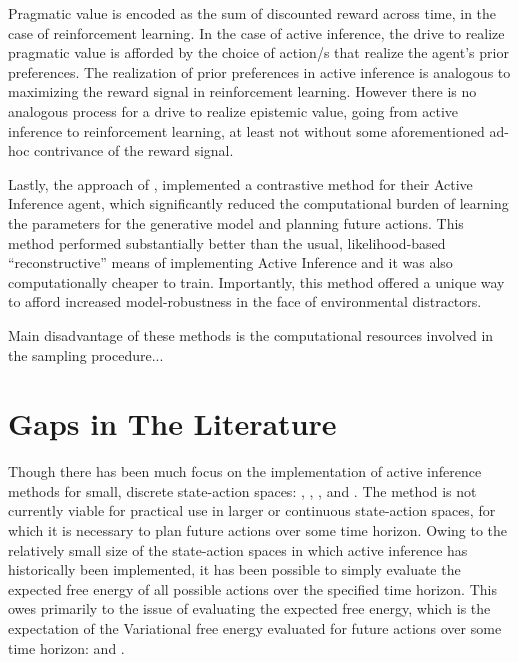 \documentclass[onecolumn]{IEEEtran}
\begin{document}
Pragmatic value is encoded as the sum of discounted reward across time, in the case of reinforcement learning. In the case of active inference, the drive to realize pragmatic value is afforded by the choice of action/s that realize the agent's prior preferences. The realization of prior preferences in active inference is analogous to maximizing the reward signal in reinforcement learning. However there is no analogous process for a drive to realize epistemic value, going from active inference to reinforcement learning, at least not without some aforementioned ad-hoc contrivance of the reward signal. 

Lastly, the approach of \textcite{Contrastive-AIF}, implemented a contrastive method for their Active Inference agent, which significantly reduced the computational burden of learning the parameters for the generative model and planning future actions. This method performed substantially better than the usual, likelihood-based ``reconstructive'' means of implementing Active Inference and it was also computationally cheaper to train. Importantly, this method offered a unique way to afford increased model-robustness in the face of environmental distractors. 

Main disadvantage of these methods is the computational resources involved in the sampling procedure...

\section{Gaps in The Literature}
Though there has been much focus on the implementation of active inference methods for small, discrete state-action spaces: \textcite{Applications-of-FEP-Machine-Learning-Neuroscience}, \textcite{AIF-Discrete-Action-Spaces-Synthesis}, \textcite{Step-by-Step-Tutorial-AIF-Empirical-Data}, \textcite{Relationship-Dynamic-Programming-AIF} and \textcite{AIF-Epistemic-Value}. The method is not currently viable for practical use in larger or continuous state-action spaces, for which it is necessary to plan future actions over some time horizon. Owing to the relatively small size of the state-action spaces in which active inference has historically been implemented, it has been possible to simply evaluate the expected free energy of all possible actions over the specified time horizon. This owes primarily to the issue of evaluating the expected free energy, which is the expectation of the Variational free energy evaluated for future actions over some time horizon: \textcite{Message-Passing-Perspective-Planning-Under-AIF} and \textcite{Bayesian-Policy-Selection-Using-AIF}. 
\end{document}
